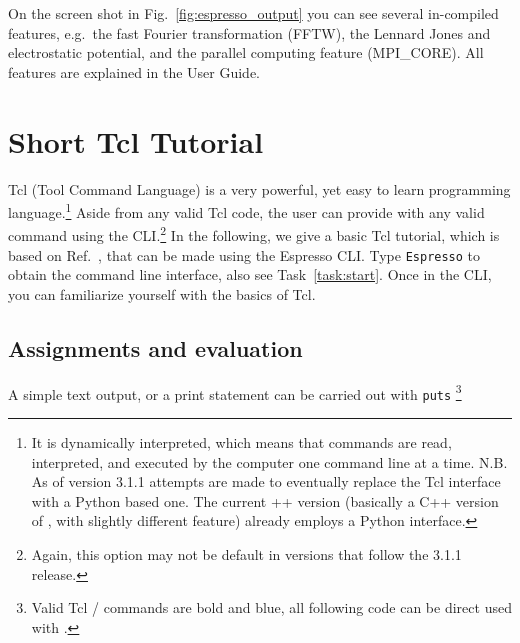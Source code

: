 \documentclass[
paper=a4,                       %
fontsize=11pt,                  %
twoside,                        %
footsepline,                    %
headsepline,                    %
headinclude=false,              %
footinclude=false,              %
pagesize,                       %
]{scrartcl}
\newtheorem{task}{Task}
\begin{document}
\vspace{1cm}
\vspace{1cm}

On the screen shot in Fig.~\ref{fig:espresso_output} you can see several in-compiled features, e.g.~the fast Fourier transformation (FFTW), the Lennard Jones and electrostatic potential, and the parallel computing feature (MPI\_CORE). All features are explained in the \es{} User Guide.

\section{Short Tcl Tutorial}\label{sec:tcl}

Tcl (Tool Command Language) is a very powerful, yet easy to learn programming language.\footnote{It is dynamically interpreted, which means that commands are read, interpreted, and executed by the computer one command line at a time. N.B. As of version 3.1.1 attempts are made to eventually replace the Tcl interface with a Python based one. The current \es{}++ version (basically a C++ version of \es{}, with slightly different feature) already employs a Python interface.} Aside from any valid Tcl code, the user can provide \es{} with any valid \es{} command using the CLI.\footnote{Again, this option may not be default in \es{} versions that follow the 3.1.1 release.} In the following, we give a basic Tcl tutorial, which is based on Ref.~\cite{tcl_tut_url}, that can be made using the Espresso CLI. Type \texttt{Espresso} to obtain the \es{} command line interface, also see Task~\ref{task:start}. Once in the CLI, you can familiarize yourself with the basics of Tcl. 
   
\subsection{Assignments and evaluation}

A simple text output, or a print statement can be carried out with \lstinline|puts| \footnote{Valid Tcl / \es{} commands are bold and blue, all following code can be direct used with \es{}.}
      
\end{document}
